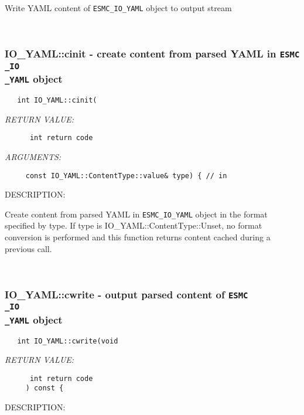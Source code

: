         Write YAML content of {\tt ESMC\_IO\_YAML} object to output stream
   
 
\mbox{}\hrulefill\
 
\subsubsection [IO\_YAML::cinit] {IO\_YAML::cinit - create content from parsed YAML in {\tt ESMC\\_IO\\_YAML} object}


  
\begin{verbatim}   int IO_YAML::cinit(\end{verbatim}{\em RETURN VALUE:}
\begin{verbatim}      int return code\end{verbatim}{\em ARGUMENTS:}
\begin{verbatim}     const IO_YAML::ContentType::value& type) { // in
 \end{verbatim}
{\sf DESCRIPTION:\\ }


        Create content from parsed YAML in {\tt ESMC\_IO\_YAML} object in the
        format specified by type. If type is IO_YAML::ContentType::Unset,
        no format conversion is performed and this function returns content
        cached during a previous call.
   
 
\mbox{}\hrulefill\
 
\subsubsection [IO\_YAML::cwrite] {IO\_YAML::cwrite - output parsed content of {\tt ESMC\\_IO\\_YAML} object}


  
\begin{verbatim}   int IO_YAML::cwrite(void\end{verbatim}{\em RETURN VALUE:}
\begin{verbatim}      int return code
     ) const {
 \end{verbatim}
{\sf DESCRIPTION:\\ }


